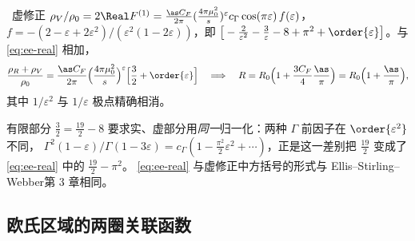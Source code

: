 \begin{proposition}[$\order{\as}$ 的 $R$]\label{prop:ee-R1}\tagR\
虚修正 $\rho_V/\rho_0=2\Real F^{(1)}=\frac{\as C_F}{2\pi}(\frac{4\pi\mu_0^2}{s})^{\varepsilon}c_\Gamma\cos(\pi\varepsilon)\,f(\varepsilon)$，
$f=-(2-\varepsilon+2\varepsilon^2)/(\varepsilon^2(1-2\varepsilon))$，即 $\big[-\frac{2}{\varepsilon^2}-\frac{3}{\varepsilon}-8+\pi^2+\order{\varepsilon}\big]$。与 \cref{eq:ee-real} 相加，
\begin{equation}\label{eq:ee-R1}
\frac{\rho_R+\rho_V}{\rho_0}=\frac{\as C_F}{2\pi}\Big(\frac{4\pi\mu_0^2}{s}\Big)^{\varepsilon}\Big[\frac32+\order{\varepsilon}\Big]
\quad\Longrightarrow\quad
R=R_0\Big(1+\frac{3C_F}{4}\frac{\as}{\pi}\Big)=R_0\Big(1+\frac{\as}{\pi}\Big),
\end{equation}
其中 $1/\varepsilon^2$ 与 $1/\varepsilon$ 极点精确相消\cite{AppelquistGeorgi1973,Zee1973}。
\end{proposition}
有限部分 $\frac32=\frac{19}{2}-8$ 要求实、虚部分用\emph{同一}归一化：两种 $\Gamma$ 前因子在 $\order{\varepsilon^2}$ 不同，
$\Gamma^2(1-\varepsilon)/\Gamma(1-3\varepsilon)=c_\Gamma(1-\frac{\pi^2}{2}\varepsilon^2+\cdots)$，正是这一差别把 $\frac{19}{2}$ 变成了 \cref{eq:ee-real} 中的 $\frac{19}{2}-\pi^2$。
\cref{eq:ee-real} 与虚修正中方括号的形式与 Ellis--Stirling--Webber\cite{EllisStirlingWebber1996}第 3 章相同。

\subsection{欧氏区域的两圈关联函数}\label{sec:ee-2loop}

